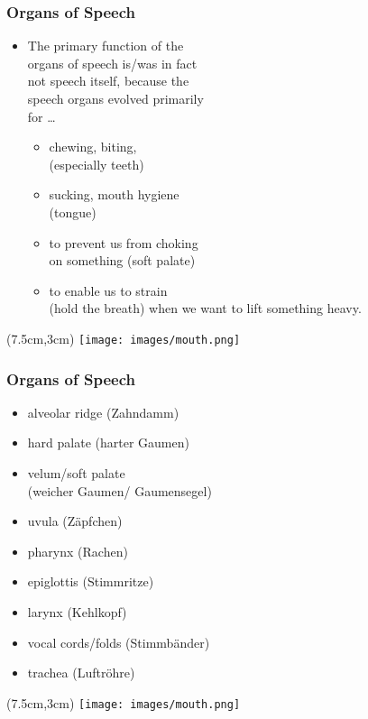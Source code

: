 \documentclass[12pt, table]{beamer}
\begin{document}
\begin{frame}
\frametitle{Organs of Speech}
\begin{itemize}
\item The primary function of the\\
organs of speech is/was in fact\\
not speech itself, because the\\
speech organs evolved primarily\\
for \dots
\begin{itemize}
\item chewing, biting,\\
(especially teeth) 
\item sucking, mouth hygiene\\
(tongue)
\item to prevent us from choking\\
on something (soft palate) 
\item to enable us to strain\\
(hold the breath) when we want to lift something heavy.
\end{itemize}
\end{itemize}
\begin{textblock*}{4cm}(7.5cm,3cm)
\texttt{[image: images/mouth.png]}
\end{textblock*}
\end{frame}

\begin{frame}
\frametitle{Organs of Speech}
\begin{itemize}
\item alveolar ridge (Zahndamm)
\item hard palate (harter Gaumen)
\item velum/soft palate\\(weicher Gaumen/ Gaumensegel)
\item uvula (Z{\"a}pfchen)
\item pharynx (Rachen)
\item epiglottis (Stimmritze)
\item larynx (Kehlkopf)
\item vocal cords/folds (Stimmb{\"a}nder)
\item trachea (Luftr{\"o}hre)
\end{itemize}
\begin{textblock*}{4cm}(7.5cm,3cm)
\texttt{[image: images/mouth.png]}
\end{textblock*}
\end{frame}
\end{document}
